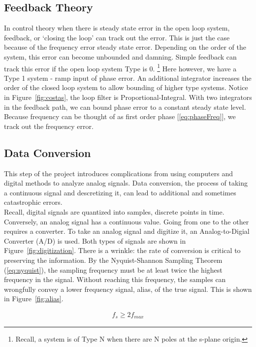 \documentclass[]{article}
\begin{document}
\subsection{Feedback Theory}
\label{sec:feedback}
In control theory when there is steady state error in the open loop system, feedback, or `closing the loop' can track out the error. This is just the case because of the frequency error steady state error.  Depending on the order of the system, this error can become unbounded and damning.  Simple feedback can track this error if the open loop system Type is 0.  \footnote{Recall, a system is of Type N when there are N poles at the s-plane origin.}  Here however, we have a Type 1 system - ramp input of phase error.  An additional integrator increases the order of the closed loop system to allow bounding of higher type systems. Notice in Figure~\ref{fig:costas}, the loop filter is Proportional-Integral.  With two integrators in the feedback path, we can bound phase error to a constant steady state level.  Because frequency can be thought of as first order phase [\ref{eq:phaseFreq}], we track out the frequency error.\\

\subsection{Data Conversion}
\label{sec:converter}
This step of the project introduces complications from using computers and digital methods to analyze analog signals.  Data conversion, the process of taking a continuous signal and descretizing it, can lead to additional and sometimes catastrophic errors.\\

Recall, digital signals are quantized into samples, discrete points in time.  Conversely, an analog signal has a continuous value.  Going from one to the other requires a converter.  To take an analog signal and digitize it, an Analog-to-Digial Converter (A/D) is used.  Both types of signals are shown in Figure~\ref{fig:digitization}.  There is a wrinkle: the rate of conversion is critical to preserving the information.  By the Nyquist-Shannon Sampling Theorem (\ref{eq:nyquist}), the sampling frequency must be at least twice the highest frequency in the signal.  Without reaching this frequency, the samples can wrongfully convey a lower frequency signal, alias, of the true signal.  This is shown in Figure~\ref{fig:alias}.  

\begin{align}
\label{eq:nyquist}
f_s \geq 2 f_{max}
\end{align}
\end{document}
